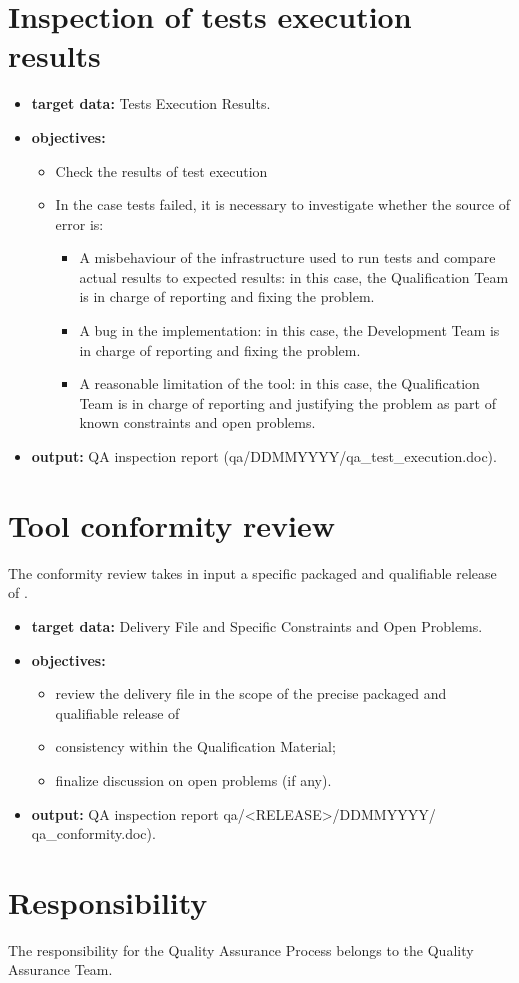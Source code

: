 \documentclass {report}
\begin{document}
\section{Inspection of tests execution results}
\begin{itemize}
\item \textbf{target data:} Tests Execution Results.
\item \textbf{objectives:}
\begin{itemize}
\item Check the results of test execution
\item In the case tests failed, it is necessary to investigate whether the source of error is:
\begin{itemize}
\item A misbehaviour of the infrastructure used to run tests and compare actual results to expected results: in this case, the Qualification Team is in charge
of reporting and fixing the problem.
\item A bug in the \xcov implementation: in this case, the Development
Team is in charge of reporting and fixing the problem.
\item A reasonable limitation of the tool: in this case, the Qualification
Team is in charge of reporting and justifying the problem as part of \xcov known constraints and open problems.
\end{itemize}
\end{itemize}
\item \textbf{output:} QA inspection report (qa/DDMMYYYY/qa\_test\_execution.doc).
\end{itemize}

\section{Tool conformity review}
The conformity review takes in input a specific packaged and qualifiable release of \xcov.
\begin{itemize}
\item \textbf{target data:} Delivery File and Specific Constraints and Open Problems.
\item \textbf{objectives:}
\begin{itemize}
\item review the delivery file in the scope of the precise packaged and qualifiable release of \xcov
\item consistency within the Qualification Material;
\item finalize discussion on open problems (if any).
\end{itemize}
\item \textbf{output:} QA inspection report qa/<RELEASE>/DDMMYYYY/ qa\_conformity.doc).
\end{itemize}


\section{Responsibility}
The responsibility for the Quality Assurance Process belongs to the Quality Assurance Team.
\end{document}
